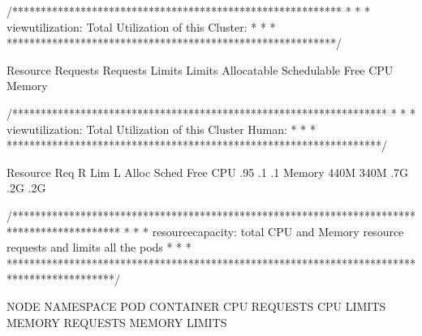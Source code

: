 \documentclass[letterpaper,10pt,english]{sphinxmanual}
\begin{document}
\begin{sphinxVerbatim}[commandchars=\\\{\}]
/**********************************************************
 *                                                        *
 *  view\PYGZhy{}utilization: Total Utilization of this Cluster:  *
 *                                                        *
 **********************************************************/

Resource   Requests  \PYGZpc{}Requests     Limits  \PYGZpc{}Limits  Allocatable  Schedulable        Free
CPU                                                                  
Memory                                

/******************************************************************
 *                                                                *
 *  view\PYGZhy{}utilization: Total Utilization of this Cluster Human:  *
 *                                                                *
 ******************************************************************/

Resource   Req   \PYGZpc{}R   Lim  \PYGZpc{}L  Alloc  Sched  Free
CPU       .95  \PYGZpc{}       \PYGZpc{}          .1   .1
Memory    440M   \PYGZpc{}  340M  \PYGZpc{}   .7G   .2G  .2G

/*******************************************************************************************
 *                                                                                         *
 *  resource\PYGZhy{}capacity: total CPU and Memory resource requests and limits  all the pods  *
 *                                                                                         *
 *******************************************************************************************/

NODE                NAMESPACE     POD                                         CONTAINER                 CPU REQUESTS   CPU LIMITS   MEMORY REQUESTS   MEMORY LIMITS


\end{sphinxVerbatim}
\end{document}
